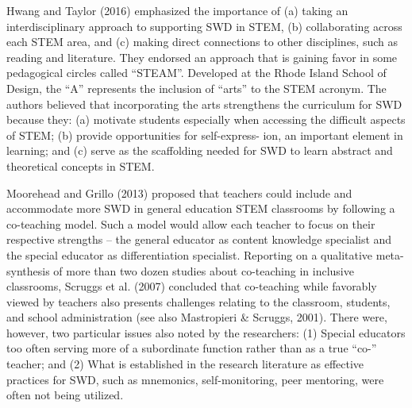 \documentclass[11.5pt]{sig-alternate}
\begin{document}
\begin{large}
Hwang and Taylor (2016) emphasized the importance of (a) taking an interdisciplinary approach to supporting SWD in STEM, (b) collaborating across each STEM area, and (c) making direct connections to other disciplines, such as reading and literature. They endorsed an approach that is gaining favor in some pedagogical circles called “STEAM”. Developed at the Rhode Island School of Design, the “A” represents the inclusion of “arts” to the STEM acronym. The authors believed that incorporating the arts strengthens the curriculum for SWD because they: (a) motivate students especially when accessing the difficult aspects of STEM; (b) provide opportunities for self-express- ion, an important element in learning; and (c) serve as the scaffolding needed for SWD to learn abstract and theoretical concepts in STEM. 

Moorehead and Grillo (2013) proposed that teachers could include and accommodate more SWD in general education STEM classrooms by following a co-teaching model. Such a model would allow each teacher to focus on their respective strengths – the general educator as content knowledge specialist and the special educator as differentiation specialist. Reporting on a qualitative meta-synthesis of more than two dozen studies about co-teaching in inclusive classrooms, Scruggs et al. (2007) concluded that co-teaching while favorably viewed by teachers also presents challenges relating to the classroom, students, and school administration (see also Mastropieri \& Scruggs, 2001). There were, however, two particular issues also noted by the researchers: (1) Special educators too often serving more of a subordinate function rather than as a true “co-” teacher; and (2) What is established in the research literature as effective practices for SWD, such as mnemonics, self-monitoring, peer mentoring, were often not being utilized.      


\end{large}
\end{document}

